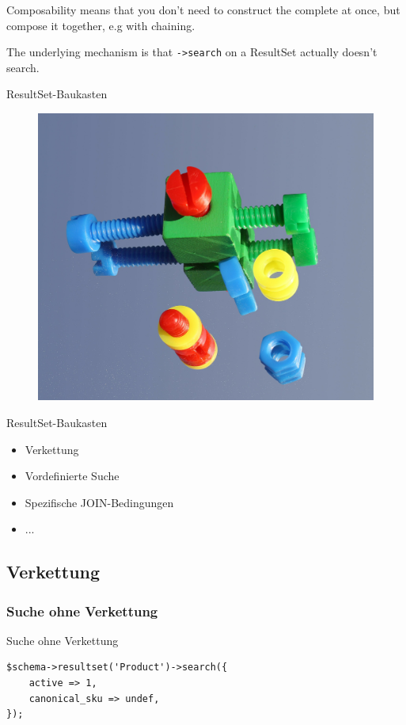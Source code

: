 Composability means that you don't need to construct the
complete at once, but compose it together, e.g with
chaining.

The underlying mechanism is that \verb|->search| on a
ResultSet actually doesn't search.


\begin{frame}{ResultSet-Baukasten}
\begin{figure}[!ht]
\centering
\includegraphics[width=0.70\linewidth]{img/baukasten.jpg}
\end{figure}
\end{frame}

\begin{frame}{ResultSet-Baukasten}
\begin{itemize}
\item Verkettung
\item Vordefinierte Suche
\item Spezifische JOIN-Bedingungen
\item ...
\end{itemize}
\end{frame}

\subsection{Verkettung}

\subsubsection{Suche ohne Verkettung}

\begin{frame}[fragile]{Suche ohne Verkettung}
\begin{lstlisting}
$schema->resultset('Product')->search({
    active => 1,
    canonical_sku => undef,
});
\end{lstlisting}
\end{frame}

